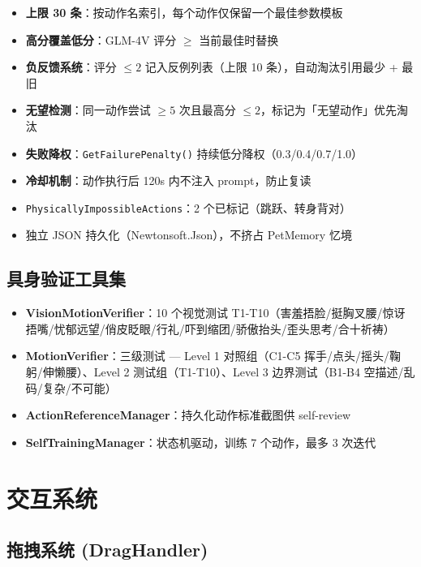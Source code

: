 \documentclass[12pt,a4paper]{ctexart}
\begin{document}
\begin{itemize}
    \item \textbf{上限 30 条}：按动作名索引，每个动作仅保留一个最佳参数模板
    \item \textbf{高分覆盖低分}：GLM-4V 评分 $\geq$ 当前最佳时替换
    \item \textbf{负反馈系统}：评分 $\leq 2$ 记入反例列表（上限 10 条），自动淘汰引用最少 + 最旧
    \item \textbf{无望检测}：同一动作尝试 $\geq 5$ 次且最高分 $\leq 2$，标记为「无望动作」优先淘汰
    \item \textbf{失败降权}：\texttt{GetFailurePenalty()} 持续低分降权（0.3/0.4/0.7/1.0）
    \item \textbf{冷却机制}：动作执行后 120s 内不注入 prompt，防止复读
    \item \texttt{PhysicallyImpossibleActions}：2 个已标记（跳跃、转身背对）
    \item 独立 JSON 持久化（Newtonsoft.Json），不挤占 PetMemory 忆境
\end{itemize}

\subsection{具身验证工具集}

\begin{itemize}
    \item \textbf{VisionMotionVerifier}：10 个视觉测试 T1-T10（害羞捂脸/挺胸叉腰/惊讶捂嘴/忧郁远望/俏皮眨眼/行礼/吓到缩团/骄傲抬头/歪头思考/合十祈祷）
    \item \textbf{MotionVerifier}：三级测试 --- Level 1 对照组（C1-C5 挥手/点头/摇头/鞠躬/伸懒腰）、Level 2 测试组（T1-T10）、Level 3 边界测试（B1-B4 空描述/乱码/复杂/不可能）
    \item \textbf{ActionReferenceManager}：持久化动作标准截图供 self-review
    \item \textbf{SelfTrainingManager}：状态机驱动，训练 7 个动作，最多 3 次迭代
\end{itemize}

\section{交互系统}

\subsection{拖拽系统 (DragHandler)}
\end{document}
